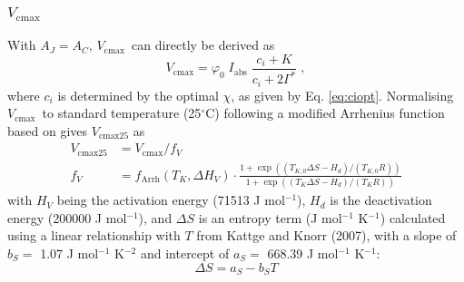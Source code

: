 \documentclass{myreport}
\newcommand{\vcmax}{$V_{\text{cmax}}$}
\begin{document}
\subsubsection{$V_{\mathrm{cmax}}$}
With $A_J=A_C$, \vcmax\ can directly be derived as 
\begin{equation}
    \label{eq:vcmax}
    V_{\mathrm{cmax}} = \varphi_0\;I_{\mathrm{abs}}\;\frac{c_i + K}{c_i + 2\Gamma^\ast} \;,
\end{equation}
where $c_i$ is determined by the optimal $\chi$, as given by Eq. \ref{eq:ciopt}. Normalising \vcmax\ to standard temperature (25$^{\circ}$C) following a modified Arrhenius function based on \cite{kattge07} gives $V_{\mathrm{cmax25}}$ as
\begin{align}
\label{eq:vcmaxsens}
    V_{\mathrm{cmax25}} &= V_{\mathrm{cmax}} / f_V \\ 
    f_V &= f_{\text{Arrh}}(T_K, \Delta H_V) \cdot \frac{1+\exp( (T_{K,0}\Delta S-H_d) / (T_{K,0} R) )}{1+\exp( (T_K\Delta S - H_d)/(T_K R) )}
\end{align}
with $H_V$ being the activation energy (71513 J mol$^{-1}$), $H_d$ is the deactivation energy (200000 J mol$^{-1}$), and $\Delta S$ is an entropy term (J mol$^{-1}$ K$^{-1}$) calculated using a linear relationship with $T$ from Kattge and Knorr (2007), with a slope of $b_S =$ 1.07 J mol$^{-1}$ K$^{-2}$ and intercept of $a_S = $ 668.39 J mol$^{-1}$ K$^{-1}$:
\begin{equation}
    \Delta S = a_S - b_S T
\end{equation}
\end{document}
